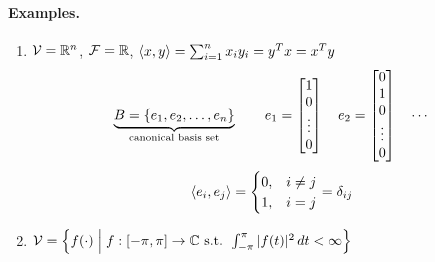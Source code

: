 \paragraph{Examples.}
\begin{enumerate}[label=\arabic*)]
\item $\mathcal{V}=\mathbb{R}^n$, $\mathcal{F}=\mathbb{R}$, \quad $\left\langle x, y \right\rangle = \sum_{i=1}^n x_iy_i = y^{T} x = x^{T} y$
\[
\underbrace{B = \{e_1, e_2, \ldots, e_n\}}_{\text{canonical basis set}} \qquad
e_1 = \begin{bmatrix}1\\ 0\\ \vdots\\ 0\end{bmatrix} \quad e_2 = \begin{bmatrix}0\\ 1\\ 0\\ \vdots\\ 0\end{bmatrix} \quad \cdots
\]
\[
\left\langle e_i, e_j \right\rangle = \begin{cases} 0, & i\neq j\\ 1, & i = j\end{cases} = \delta_{ij}
\]
\item $\mathcal{V} = \left\{ f(\cdot) \;\middle|\; f:[-\pi,\pi]\to\mathbb{C} \text{ s.t. } \int_{-\pi}^{\pi}|f(t)|^2\,dt < \infty\right\}$


\end{enumerate}
